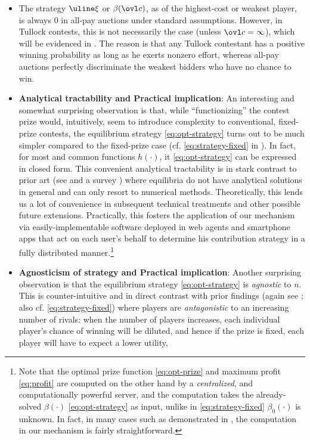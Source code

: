 \documentclass{sig-alternate-10pt}
\begin{document}
\begin{itemize}[leftmargin=0.8em]
\item The strategy $\uline\xi$ or $\beta(\ovl c)$, as of the highest-cost or weakest player, is always 0 in all-pay auctions under standard assumptions. However, in Tullock contests, this is not necessarily the case (unless $\ovl c=\infty$), which will be evidenced in . The reason is that any Tullock contestant has a positive winning probability as long as he exerts nonzero effort, whereas all-pay auctions perfectly discriminate the weakest bidders who have no chance to win.
\item {\bf Analytical tractability and Practical implication}: An interesting and somewhat surprising observation is that, while ``functionizing'' the contest prize would, intuitively, seem to introduce complexity to conventional, fixed-prize contests, the equilibrium strategy \eqref{eq:opt-strategy} turns out to be much simpler compared to the fixed-prize case (cf. \eqref{eq:strategy-fixed} in ). In fact, for most and common functions $h(\cdot)$, it \eqref{eq:opt-strategy} can be expressed in closed form. This convenient analytical tractability is in stark contrast to prior art (see \cite{Fey08,Ryvkin10,Wasser13} and a survey \cite{Konrad09book}) where equilibria do not have analytical solutions in general and can only resort to numerical methods.  Theoretically, this lends us a lot of convenience in subsequent technical treatments and other possible future extensions. Practically, this fosters the application of our mechanism via easily-implementable software deployed in web agents and smartphone apps that act on each user's behalf to determine his contribution strategy in a fully distributed manner.\footnote{Note that the optimal prize function \eqref{eq:opt-prize} and maximum profit \eqref{eq:profit} are computed on the other hand by a {\em centralized}, and computationally powerful server, and the computation takes the already-solved $\beta(\cdot)$ \eqref{eq:opt-strategy} as input, unlike in \eqref{eq:strategy-fixed} $\beta_0(\cdot)$ is unknown. In fact, in many cases such as demonstrated in , the computation in our mechanism is fairly straightforward.}
\item {\bf Agnosticism of strategy and Practical implication}: Another surprising observation is that the equilibrium strategy \eqref{eq:opt-strategy} is {\em agnostic} to $n$. This is counter-intuitive and in direct contrast with prior findings (again see \cite{Fey08,Ryvkin10,Wasser13,Konrad09book}; also cf. \eqref{eq:strategy-fixed}) where players are {\em antagonistic} to an increasing number of rivals: when the number of players increases, each individual player's chance of winning will be diluted, and hence if the prize is fixed, each player will have to expect a lower utility,

\end{itemize}
\end{document}
